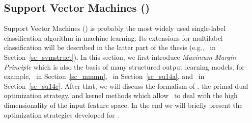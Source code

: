 {\iffalse
The key is to introduce a set of tighter upper bounds on (\ref{lr_posteriori_log}) that are parameterized by $\valpha$.
The bounds should have a simple form such that the maximizing (\ref{lr_posteriori_log}) over $\vw$ can be solved analytically with $\alpha$.
The solution to the original problem is transferred as finding the tighter upper bounds for  $\vw$, which is to minimize with respect to $\alpha$.

Later on, optimization algorithms that are based on dual form have been developed, for example iterative optimization method \citep{Keerthi05a} and the dual coordinate descent method \citep{Yu11dual}.
\fi


%
% 
\subsection{Support Vector Machines (\svm)}	\label{sc_svm}

Support Vector Machines (\svm) is probably the most widely used single-label classification algorithm in machine learning.
Its extensions for multilabel classification will be described in the latter part of the thesis (e.g., \svmstruct\ in Section~\ref{sc_svmstruct}).
In this section, we first introduce \textit{Maximum-Margin Principle} which is also the basis of many structured output learning models, for example,  \mmmn\ in Section~\ref{sc_mmmn}, \spin\ in Section~\ref{sc_su14a}, and \rta\ in Section~\ref{sc_su14c}.
After that, we will discuss the formalism of \svm, the primal-dual optimization strategy, and kernel methods which allow \svm\ to deal with the high dimensionality of the input feature space.
In the end we will briefly present the optimization strategies developed for \svm.

}
